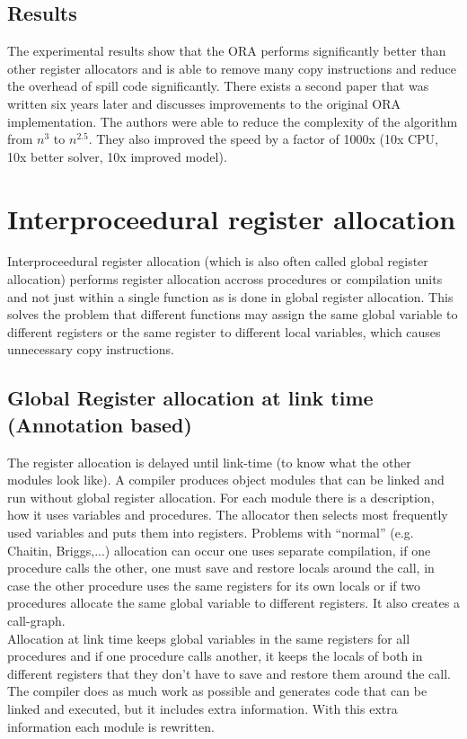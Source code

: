 \documentclass[a4paper,10pt]{article}
\begin{document}
\subsection{Results}
The experimental results show that the ORA performs significantly better than other register allocators and is able to remove many
copy instructions and reduce the overhead of spill code significantly. There exists a second paper that was written six years later and
discusses improvements to the original ORA implementation. The authors were able to reduce the complexity of the algorithm
from $n^3$ to $n^{2.5}$. They also improved the speed by a factor of 1000x (10x CPU, 10x better solver, 10x improved model).


\section{Interproceedural register allocation}
Interproceedural register allocation (which is also often called global register allocation) performs register allocation accross procedures or compilation units and not just within a single function as is done in global register allocation. This solves the problem that different functions may assign the same global variable to different registers or the same register to different local variables, which causes unnecessary copy instructions.

\subsection{Global Register allocation at link time (Annotation based)}
The register allocation is delayed until link-time (to know what the other modules look like). A compiler produces object modules that can be linked and run without global register allocation. For each module there is a description, how it uses variables and procedures. The allocator then selects most frequently used variables and puts them into registers. Problems with ``normal'' (e.g. Chaitin, Briggs,...) allocation can occur one uses separate compilation, if one procedure calls the other, one must save and restore locals around the call, in case the other procedure uses the same registers for its own locals or if two procedures allocate the same global variable to different registers. It also creates a call-graph.\\

Allocation at link time keeps global variables in the same registers for all procedures and if one procedure calls another, it keeps the locals of both in different registers that they don't have to save and restore them around the call. The compiler does as much work as possible and generates code that can be linked and executed, but it includes extra information. With this extra information each module is rewritten.\\
\end{document}
